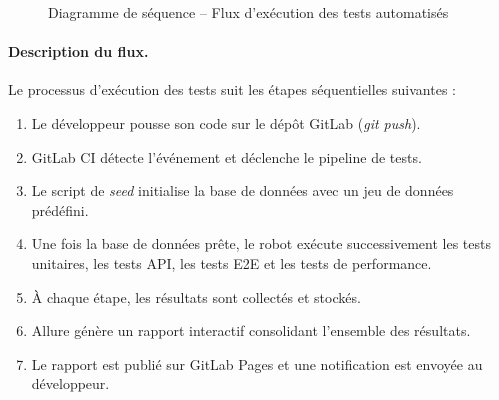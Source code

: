 \begin{figure}[H]
\caption{Diagramme de séquence -- Flux d'exécution des tests automatisés}
\label{fig:sequence-diagram}
\end{figure}

\paragraph{Description du flux.}
Le processus d'exécution des tests suit les étapes séquentielles suivantes :
\begin{enumerate}[nosep]
    \item Le développeur pousse son code sur le dépôt GitLab (\textit{git push}).
    \item GitLab CI détecte l'événement et déclenche le pipeline de tests.
    \item Le script de \textit{seed} initialise la base de données avec un jeu de données prédéfini.
    \item Une fois la base de données prête, le robot exécute successivement les tests unitaires, les tests API, les tests E2E et les tests de performance.
    \item À chaque étape, les résultats sont collectés et stockés.
    \item Allure génère un rapport interactif consolidant l'ensemble des résultats.
    \item Le rapport est publié sur GitLab Pages et une notification est envoyée au développeur.
\end{enumerate}

